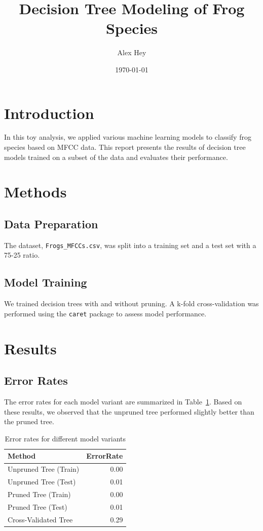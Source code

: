 \documentclass{article}\usepackage[]{graphicx}\usepackage[]{xcolor}
\title{Decision Tree Modeling of Frog Species}
\author{Alex Hey}
\date{\today}
\begin{document}
\maketitle

\section{Introduction}
In this toy analysis, we applied various machine learning models to classify frog species based on MFCC data. This report presents the results of decision tree models trained on a subset of the data and evaluates their performance.

\section{Methods}
\subsection{Data Preparation}
The dataset, \texttt{Frogs\_MFCCs.csv}, was split into a training set and a test set with a 75-25 ratio. 

\subsection{Model Training}
We trained decision trees with and without pruning. A k-fold cross-validation was performed using the \texttt{caret} package to assess model performance.

\section{Results}
\subsection{Error Rates}
The error rates for each model variant are summarized in Table~\ref{tab:results}. Based on these results, we observed that the unpruned tree performed slightly better than the pruned tree.

\begin{table}[ht]
\centering
\begin{tabular}{lr}
  \hline
Method & ErrorRate \\ 
  \hline
Unpruned Tree (Train) & 0.00 \\ 
  Unpruned Tree (Test) & 0.01 \\ 
  Pruned Tree (Train) & 0.00 \\ 
  Pruned Tree (Test) & 0.01 \\ 
  Cross-Validated Tree & 0.29 \\ 
   \hline
\end{tabular}
\caption{Error rates for different model variants} 
\label{tab:results}
\end{table}
\end{document}
